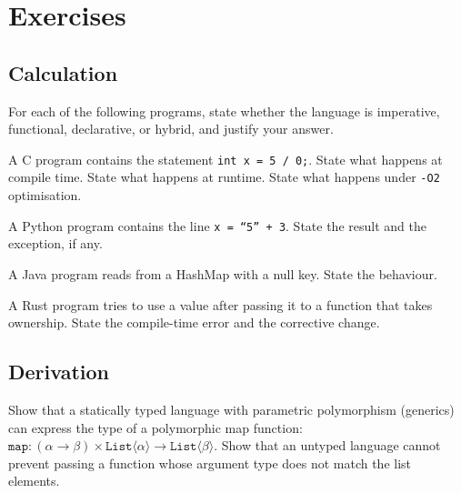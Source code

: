 \section{Exercises}

\subsection*{Calculation}

\begin{exercise}
For each of the following programs, state whether the language is imperative, functional, declarative, or hybrid, and justify your answer.
\end{exercise}

\begin{exercise}
A C program contains the statement \texttt{int x = 5 / 0;}. State what happens at compile time. State what happens at runtime. State what happens under \texttt{-O2} optimisation.
\end{exercise}

\begin{exercise}
A Python program contains the line \texttt{x = ``5'' + 3}. State the result and the exception, if any.
\end{exercise}

\begin{exercise}
A Java program reads from a HashMap with a null key. State the behaviour.
\end{exercise}

\begin{exercise}
A Rust program tries to use a value after passing it to a function that takes ownership. State the compile-time error and the corrective change.
\end{exercise}

\subsection*{Derivation}

\begin{exercise}
Show that a statically typed language with parametric polymorphism (generics) can express the type of a polymorphic map function: $\texttt{map} : (\alpha \to \beta) \times \texttt{List}\langle \alpha \rangle \to \texttt{List}\langle \beta \rangle$. Show that an untyped language cannot prevent passing a function whose argument type does not match the list elements.
\end{exercise}


